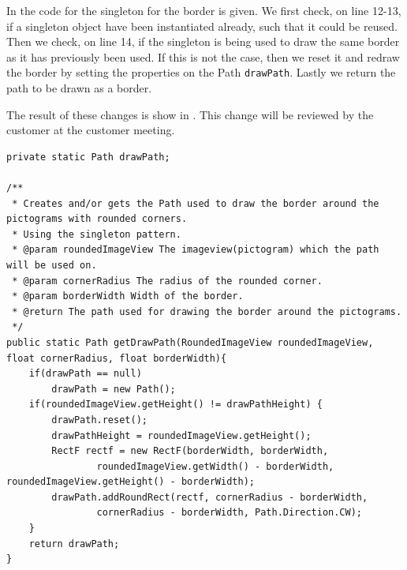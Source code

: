 In  the code for the singleton for the border is given. 
We first check, on line 12-13, if a singleton object have been instantiated already, such that it could be reused. 
Then we check, on line 14, if the singleton is being used to draw the same border as it has previously been used. 
If this is not the case, then we reset it and redraw the border by setting the properties on the Path \texttt{drawPath}. 
Lastly we return the path to be drawn as a border. 

The result of these changes is show in . 
This change will be reviewed by the customer at the customer meeting. 

\begin{lstlisting}[float, floatplacement=h, caption={One of the singletons used to solve this task.}, label={lst:singleton_example}] 
private static Path drawPath;

/**
 * Creates and/or gets the Path used to draw the border around the pictograms with rounded corners.
 * Using the singleton pattern.
 * @param roundedImageView The imageview(pictogram) which the path will be used on.
 * @param cornerRadius The radius of the rounded corner.
 * @param borderWidth Width of the border.
 * @return The path used for drawing the border around the pictograms.
 */
public static Path getDrawPath(RoundedImageView roundedImageView, float cornerRadius, float borderWidth){
    if(drawPath == null)
        drawPath = new Path();
    if(roundedImageView.getHeight() != drawPathHeight) {
        drawPath.reset();
        drawPathHeight = roundedImageView.getHeight();
        RectF rectf = new RectF(borderWidth, borderWidth,
                roundedImageView.getWidth() - borderWidth, roundedImageView.getHeight() - borderWidth);
        drawPath.addRoundRect(rectf, cornerRadius - borderWidth,
                cornerRadius - borderWidth, Path.Direction.CW);
    }
    return drawPath;
}
\end{lstlisting} 

